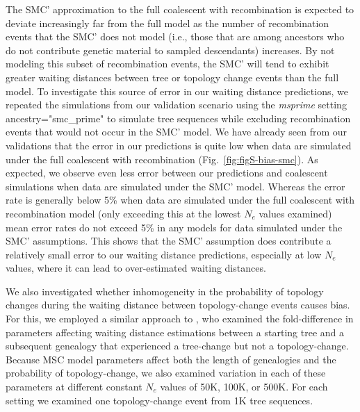 \documentclass[11pt]{article}
\begin{document}
The SMC' approximation to the full coalescent with recombination is expected 
to deviate increasingly far from the full model %
as the number of recombination events that the SMC' does not model 
(i.e., those that are among ancestors who do not contribute genetic material to sampled descendants) 
increases. 
By not modeling this subset of recombination events, the SMC' will tend to 
exhibit greater waiting distances between tree or topology change events than the full model. 
To investigate this source of error 
in our waiting distance predictions,
we repeated the simulations from our 
validation scenario using the \emph{msprime} setting ancestry="smc\_prime"
to simulate tree sequences while excluding recombination events that would 
not occur in the SMC' model. 
We have already seen from our validations that the error in our predictions 
is quite low when data are simulated under the full coalescent with 
recombination (Fig.~\ref{fig:figS-bias-smc}). %
As expected, we observe even less error 
between our predictions and coalescent simulations when data are simulated
under the SMC' model. Whereas the error 
rate is generally below 5\% when data are simulated under the full coalescent
with recombination model (only exceeding this at the lowest
$N_e$ values examined) mean error rates do not exceed 5\% in any 
models for data simulated under the SMC' assumptions. 
This shows that the SMC' assumption does contribute a relatively small error 
to our waiting distance predictions, especially at low $N_e$ values,
where it can lead to over-estimated waiting distances.

We also investigated whether inhomogeneity in the probability of topology 
changes during the waiting distance between topology-change events 
causes bias. 
For this, we employed a similar approach to \citet{deng_distribution_2021}, 
who examined the fold-difference in parameters affecting waiting distance
estimations between a starting tree and a subsequent genealogy that 
experienced a tree-change but not a topology-change. 
Because MSC model parameters affect both the length of genealogies and
the probability of topology-change, we also examined variation in each of these 
parameters at different constant $N_e$ values of 50K, 100K, or 500K. 
For each setting we examined one topology-change event from 1K tree sequences. 
\end{document}
